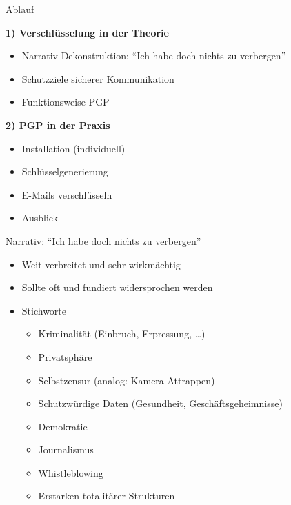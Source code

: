 \documentclass{beamer}
\begin{document}

\begin{frame}{Ablauf}

  \textbf{1) Verschlüsselung in der Theorie}
  \begin{itemize}
   \item Narrativ-Dekonstruktion: "`Ich habe doch nichts zu verbergen"'
   \item Schutzziele sicherer Kommunikation
   \item Funktionsweise PGP
  \end{itemize}

  \pause

  \textbf{2) PGP in der Praxis}
  \begin{itemize}
   \item Installation (individuell)
   \item Schlüsselgenerierung
   \item E-Mails verschlüsseln
   \item Ausblick
  \end{itemize}

\end{frame}


\begin{frame}{Narrativ: "`Ich habe doch nichts zu verbergen"'}


  \begin{itemize}
   \item Weit verbreitet und sehr wirkmächtig

   \item Sollte oft und fundiert widersprochen werden
   \pause

   \item Stichworte
    \begin{itemize}
     \item Kriminalität (Einbruch, Erpressung, …)
     \item Privatsphäre
     \item Selbstzensur (analog: Kamera-Attrappen)
     \item Schutzwürdige Daten (Gesundheit, Geschäftsgeheimnisse)
     \item Demokratie
     \item Journalismus
     \item Whistleblowing
     \item Erstarken totalitärer Strukturen
    \end{itemize}
  \end{itemize}

\end{frame}
\end{document}
